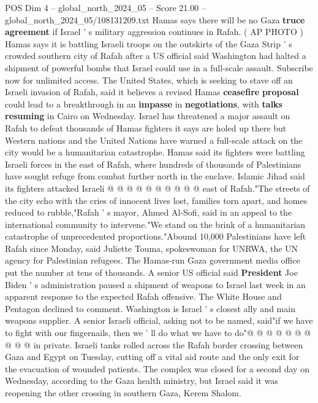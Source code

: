 \begin{textsample}{POS Dim 4 – global\_north\_2024\_05 – Score 21.00 – global\_north\_2024\_05/108131209.txt}  \label{ex:f4_pos_343}
Hamas says there will be no Gaza \textbf{truce} \textbf{agreement} if Israel ' s military aggression continues in Rafah. ( AP PHOTO ) Hamas says it is battling Israeli troops on the outskirts of the Gaza Strip ' s crowded southern city of Rafah after a US official said Washington had halted a shipment of powerful bombs that Israel could use in a full-scale assault.
Subscribe now for unlimited access.
The United States, which is seeking to stave off an Israeli invasion of Rafah, said it believes a revised Hamas \textbf{ceasefire} \textbf{proposal} could lead to a breakthrough in an \textbf{impasse} in \textbf{negotiations}, with \textbf{talks} \textbf{resuming} in Cairo on Wednesday.
Israel has threatened a major assault on Rafah to defeat thousands of Hamas fighters it says are holed up there but Western nations and the United Nations have warned a full-scale attack on the city would be a humanitarian catastrophe.
Hamas said its fighters were battling Israeli forces in the east of Rafah, where hundreds of thousands of Palestinians have sought refuge from combat further north in the enclave.
Islamic Jihad said its fighters attacked Israeli @ @ @ @ @ @ @ @ @ @ east of Rafah."The streets of the city echo with the cries of innocent lives lost, families torn apart, and homes reduced to rubble,"Rafah ' s mayor, Ahmed Al-Sofi, said in an appeal to the international community to intervene."We stand on the brink of a humanitarian catastrophe of unprecedented proportions."Abound 10,000 Palestinians have left Rafah since Monday, said Juliette Touma, spokeswoman for UNRWA, the UN agency for Palestinian refugees.
The Hamas-run Gaza government media office put the number at tens of thousands.
A senior US official said \textbf{President} Joe Biden ' s administration paused a shipment of weapons to Israel last week in an apparent response to the expected Rafah offensive.
The White House and Pentagon declined to comment.
Washington is Israel ' s closest ally and main weapons supplier.
A senior Israeli official, asking not to be named, said"if we have to fight with our fingernails, then we ' ll do what we have to do"@ @ @ @ @ @ @ @ @ @ in private.
Israeli tanks rolled across the Rafah border crossing between Gaza and Egypt on Tuesday, cutting off a vital aid route and the only exit for the evacuation of wounded patients.
The complex was closed for a second day on Wednesday, according to the Gaza health ministry, but Israel said it was reopening the other crossing in southern Gaza, Kerem Shalom.

\end{textsample}
